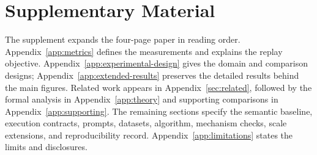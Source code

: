 
\section*{Supplementary Material}
\label{app:organization}

The supplement expands the four-page paper in reading order.
Appendix~\ref{app:metrics} defines the measurements and explains the replay
objective. Appendix~\ref{app:experimental-design} gives the domain and
comparison designs; Appendix~\ref{app:extended-results} preserves the detailed
results behind the main figures. Related work appears in
Appendix~\ref{sec:related}, followed by the formal analysis in
Appendix~\ref{app:theory} and supporting comparisons in
Appendix~\ref{app:supporting}. The remaining sections specify the semantic
baseline, execution contracts, prompts, datasets, algorithm, mechanism checks,
scale extensions, and reproducibility record. Appendix~\ref{app:limitations}
states the limits and disclosures.


